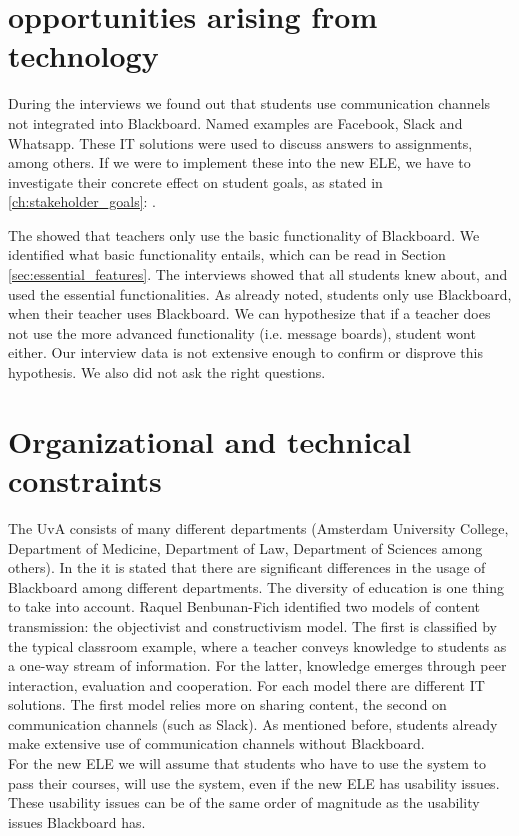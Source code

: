 \section{opportunities arising from technology}
During the interviews we found out that students use communication channels not integrated into Blackboard. Named examples are Facebook, Slack and Whatsapp. These IT solutions were used to discuss answers to assignments, among others. If we were to implement these into the new ELE, we have to investigate their concrete effect on student goals, as stated in \ref{ch:stakeholder_goals}: .

The \rreport showed that teachers only use the basic functionality of Blackboard. We identified what basic functionality entails, which can be read in Section \ref{sec:essential_features}. The interviews showed that all students knew about, and used the essential functionalities. As already noted, students only use Blackboard, when their teacher uses Blackboard. We can hypothesize that if a teacher does not use the more advanced functionality (i.e. message boards), student wont either. Our interview data is not extensive enough to confirm or disprove this hypothesis. We also did not ask the right questions. 

\section{Organizational and technical constraints}
The UvA consists of many different departments (Amsterdam University College, Department of Medicine, Department of Law, Department of Sciences among others). In the \rreport it is stated that there are significant differences in the usage of Blackboard among different departments. The diversity of education is one thing to take into account. Raquel Benbunan-Fich \cite{improveEducationWithIt} identified two models of content transmission: the objectivist and constructivism model. The first is classified by the typical classroom example, where a teacher conveys knowledge to students as a one-way stream of information. For the latter, knowledge emerges through peer interaction, evaluation and cooperation. For each model there are different IT solutions. The first model relies more on sharing content, the second on communication channels (such as Slack). As mentioned before, students already make extensive use of communication channels without Blackboard. \\


For the new ELE we will assume that students who have to use the system to pass their courses, will use the system, even if the new ELE has usability issues. These usability issues can be of the same order of magnitude as the usability issues Blackboard has.  

